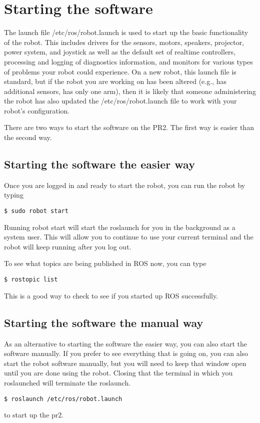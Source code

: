 \section{Starting the software}
The launch file /etc/ros/robot.launch is used to start up the basic functionality of the robot.  This includes drivers for 
the sensors, motors, speakers, projector, power system, and joystick as well as the default set of realtime controllers, 
processing and logging of diagnostics information, and monitors for various types of problems your robot could experience.  On a new robot, this launch file is standard, but if the robot you are working on has been altered (e.g., has additional sensors, has only one arm), then it is likely that someone administering the robot has also updated the /etc/ros/robot.launch file to work with your robot's configuration.

There are two ways to start the software on the PR2. The first way is easier than the second way.
 \subsection{Starting the software the easier way}

Once you are logged in and ready to start the robot, you can run the robot by typing
\begin{verbatim}
$ sudo robot start
\end{verbatim}
Running robot start will start the roslaunch for you in the background as a system user. This will 
allow you to continue to use your current terminal and the robot will keep running after you log out.  

To see what topics are being published in ROS now, you can type 
\begin{verbatim}
$ rostopic list
\end{verbatim}
This is a good way to check to see if you started up ROS successfully.

\subsection{Starting the software the manual way}
As an alternative to starting the software the easier way, you can also start the software manually. If you prefer to see everything that is going on, you can also start the robot software manually, but you will need to keep that 
window open until you are done using the robot. Closing that the terminal in which you roslaunched will terminate the roslaunch.
\begin{verbatim}
$ roslaunch /etc/ros/robot.launch
\end{verbatim}
to start up the pr2.  

